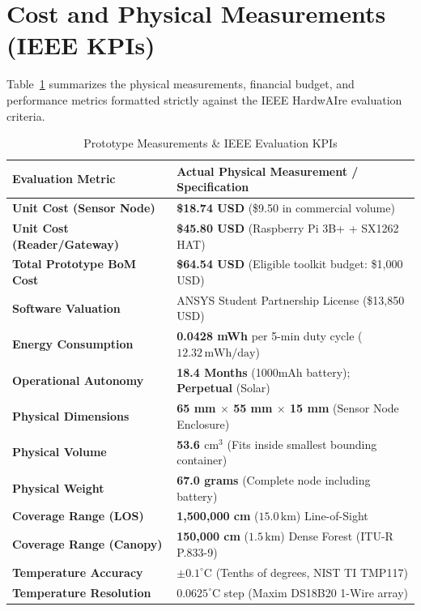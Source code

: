 \documentclass[10pt,conference,letterpaper]{IEEEtran}
\begin{document}
\section{Cost and Physical Measurements (IEEE KPIs)}
Table~\ref{tab:measurements} summarizes the physical measurements, financial budget, and performance metrics formatted strictly against the IEEE HardwAIre evaluation criteria.

\begin{table}[htbp]
\caption{Prototype Measurements \& IEEE Evaluation KPIs}
\label{tab:measurements}
\centering
\footnotesize
\begin{tabularx}{\columnwidth}{lX}
\toprule
\textbf{Evaluation Metric} & \textbf{Actual Physical Measurement / Specification} \\
\midrule
\textbf{Unit Cost (Sensor Node)} & \textbf{\$18.74 USD} (\$9.50 in commercial volume) \\
\textbf{Unit Cost (Reader/Gateway)} & \textbf{\$45.80 USD} (Raspberry Pi 3B+ + SX1262 HAT) \\
\textbf{Total Prototype BoM Cost} & \textbf{\$64.54 USD} (Eligible toolkit budget: \$1,000 USD) \\
\textbf{Software Valuation} & ANSYS Student Partnership License (\$13,850 USD) \\
\textbf{Energy Consumption} & \textbf{0.0428 mWh} per 5-min duty cycle ($12.32\,\text{mWh/day}$) \\
\textbf{Operational Autonomy} & \textbf{18.4 Months} (1000mAh battery); \textbf{Perpetual} (Solar) \\
\textbf{Physical Dimensions} & \textbf{65 mm $\times$ 55 mm $\times$ 15 mm} (Sensor Node Enclosure) \\
\textbf{Physical Volume} & \textbf{53.6 $\text{cm}^3$} (Fits inside smallest bounding container) \\
\textbf{Physical Weight} & \textbf{67.0 grams} (Complete node including battery) \\
\textbf{Coverage Range (LOS)} & \textbf{1,500,000 cm} ($15.0\,\text{km}$) Line-of-Sight \\
\textbf{Coverage Range (Canopy)} & \textbf{150,000 cm} ($1.5\,\text{km}$) Dense Forest (ITU-R P.833-9) \\
\textbf{Temperature Accuracy} & \textbf{$\pm\text{0.1}^\circ\text{C}$} (Tenths of degrees, NIST TI TMP117) \\
\textbf{Temperature Resolution} & \textbf{$\text{0.0625}^\circ\text{C}$} step (Maxim DS18B20 1-Wire array) \\
\bottomrule
\end{tabularx}
\end{table}
\end{document}
